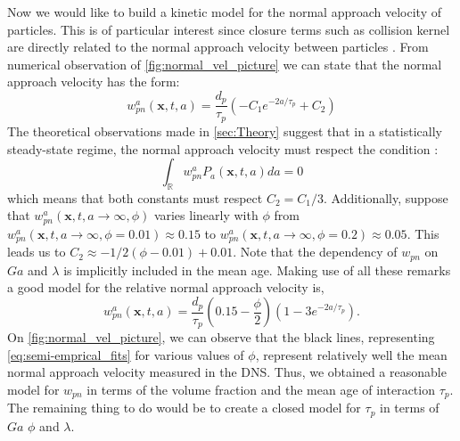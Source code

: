 Now we would like to build a kinetic model for the normal approach velocity of particles. 
This is of particular interest since closure terms such as collision kernel are directly related to the normal approach velocity between particles \citep{sundaram1997collision}.
From numerical observation of \ref{fig:normal_vel_picture} we can state that the normal approach velocity has the form:
\begin{equation}
    w_{pn}^a(\textbf{x},t,a) = \frac{d_p}{\tau_p} \left(
        - C_1 e^{- 2 a/\tau_p }
        + C_2
    \right)
\end{equation}
The theoretical observations made in \ref{sec:Theory} suggest that in a statistically steady-state regime, the normal approach velocity must respect the condition :
\begin{equation}
\int_\mathbb{R} w_{pn}^aP_a(\textbf{x},t,a) da = 0 
\end{equation}
which means that both constants must respect $C_2 = C_1 /3$. 
Additionally, suppose that $w_{pn}^a(\textbf{x},t,a\to\infty,\phi)$ varies linearly with $\phi$ from $w_{pn}^a(\textbf{x},t,a\to\infty,\phi = 0.01) \approx 0.15$ to $w_{pn}^a(\textbf{x},t,a\to\infty,\phi = 0.2) \approx 0.05$. 
This leads us to $C_2 \approx -1/2 (\phi - 0.01) + 0.01$. 
Note that the dependency of $w_{pn}$ on $Ga$ and $\lambda$ is implicitly included in the mean age.
Making use of all these remarks a good model for the relative normal approach velocity is, 
\begin{equation}
    w_{pn}^a(\textbf{x},t,a) = \frac{d_p}{\tau_p} 
    \left(
        0.15
        -\frac{\phi}{2}
    \right)\left(
        1 - 3e^{-2a/\tau_p}
    \right).
   \label{eq:semi-emprical_fits}
\end{equation}
On \ref{fig:normal_vel_picture}, we can observe that the black lines, representing \ref{eq:semi-emprical_fits} for various values of $\phi$, represent relatively well the mean normal approach velocity measured in the DNS. 
Thus, we obtained a reasonable model for $w_{pn}$ in terms of the volume fraction and the mean age of interaction $\tau_p$.
The remaining thing to do would be to create a closed model for $\tau_p$ in terms of $Ga$ $\phi$ and $\lambda$. 
